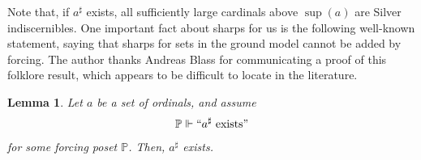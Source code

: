 \documentclass[10pt]{amsart}
\newtheorem{lemma}[theorem]{Lemma}
\theoremstyle{definition}
\newtheorem{definition}[theorem]{Definition}
\begin{document}
Note that, if $a^\sharp$ exists, all sufficiently large cardinals above $\sup(a)$ are Silver indiscernibles. One important fact about sharps for us is the following well-known statement, saying that sharps for sets in the ground model cannot be added by forcing. The author thanks Andreas Blass for communicating a proof of this folklore result, which appears to be difficult to locate in the literature.

\begin{lemma}\label{abs1}
Let $a$ be a set of ordinals, and assume
\[\mathbb P\Vdash ``a^\sharp\ \text{exists}"\]
for some forcing poset $\mathbb P$. Then, $a^\sharp$ exists.
\end{lemma}
\end{document}
